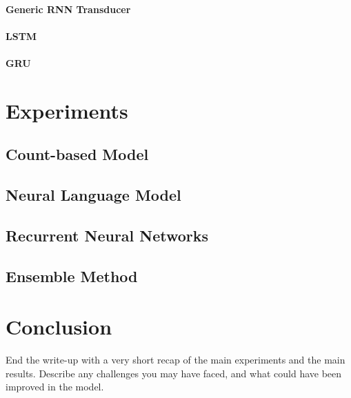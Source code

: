 \documentclass[11pt]{article}
\begin{document}
\paragraph{Generic RNN Transducer}

\paragraph{LSTM}

\paragraph{GRU}

\section{Experiments}

\subsection{Count-based Model}

\subsection{Neural Language Model}


\subsection{Recurrent Neural Networks}

\subsection{Ensemble Method}


\section{Conclusion}

End the write-up with a very short recap of the main experiments and the main results. Describe any challenges you may have faced, and what could have been improved in the model.



\end{document}
